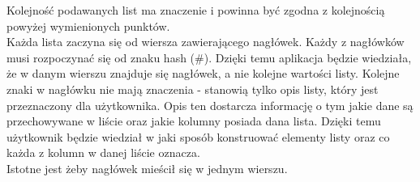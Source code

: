 \documentclass[12pt]{article}
\begin{document}
Kolejność podawanych list ma znaczenie i powinna być zgodna z kolejnością powyżej wymienionych punktów. \\
Każda lista zaczyna się od wiersza zawierającego nagłówek. Każdy z nagłówków musi rozpoczynać się od znaku hash (\#). Dzięki temu aplikacja będzie wiedziała, że w danym wierszu znajduje się nagłówek, a nie kolejne wartości listy. Kolejne znaki w nagłówku nie mają znaczenia - stanowią tylko opis listy, który jest przeznaczony dla użytkownika. Opis ten dostarcza informację o tym jakie dane są przechowywane w liście oraz jakie kolumny posiada dana lista. Dzięki temu użytkownik będzie wiedział w jaki sposób konstruować elementy listy oraz co każda z kolumn w danej liście oznacza.\\
Istotne jest żeby nagłówek mieścił się w jednym wierszu. 

\bigskip
\end{document}
